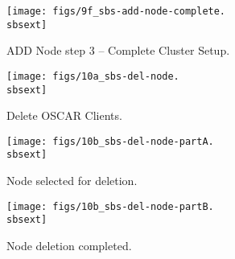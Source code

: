 \clearpage

\begin{figure}[htbp]
  \begin{center}
    \texttt{[image: figs/9f\_sbs-add-node-complete.\\sbsext]}
    \caption{ADD Node step 3 -- Complete Cluster Setup.}
    \label{fig:sbs-add-node1-cluster-setup}
  \end{center}
\end{figure}


\begin{figure}[htbp]
  \begin{center}
    \texttt{[image: figs/10a\_sbs-del-node.\\sbsext]}
    \caption{Delete OSCAR Clients.}
    \label{fig:sbs-del-node1}
  \end{center}
\end{figure}


\begin{figure}[htbp]
  \begin{center}
    \texttt{[image: figs/10b\_sbs-del-node-partA.\\sbsext]}
    \caption{Node selected for deletion.}
    \label{fig:sbs-del-node1-done-partA}
  \end{center}
\end{figure}

\begin{figure}[htbp]
  \begin{center}
    \texttt{[image: figs/10b\_sbs-del-node-partB.\\sbsext]}
    \caption{Node deletion completed.}
    \label{fig:sbs-del-node1-done-partB}
  \end{center}
\end{figure}
